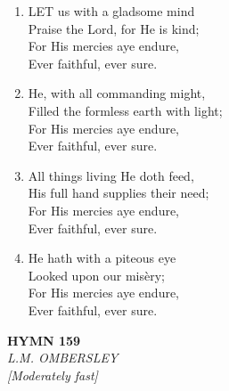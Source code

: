 \begin{enumerate}
    \item LET us with a gladsome mind \\
        Praise the Lord, for He is kind; \\
        For His mercies aye endure, \\
        Ever faithful, ever sure.

    \item He, with all commanding might, \\
        Filled the formless earth with light; \\
        For His mercies aye endure, \\
        Ever faithful, ever sure.

    \item All things living He doth feed, \\
        His full hand supplies their need; \\
        For His mercies aye endure, \\
        Ever faithful, ever sure.

    \item He hath with a piteous eye \\
        Looked upon our mis\`ery; \\
        For His mercies aye endure, \\
        Ever faithful, ever sure.

\end{enumerate}

\newpage
\begin{center}
    {\Large \textbf{HYMN 159}}
    \\
    \textit{L.M. OMBERSLEY}
    \\
    \textit{\small [Moderately fast]}
\end{center}
\vspace{1em}

